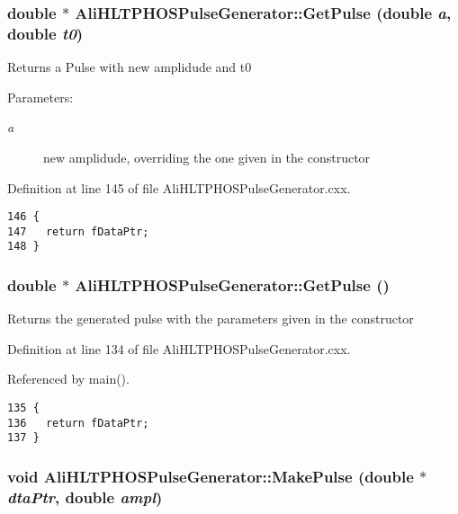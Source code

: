 \subsubsection{\setlength{\rightskip}{0pt plus 5cm}double $\ast$ Ali\-HLTPHOSPulse\-Generator::Get\-Pulse (double {\em a}, double {\em t0})}\label{classAliHLTPHOSPulseGenerator_AliHLTPHOSPulseGeneratora10}


Returns a Pulse with new amplidude and t0 \begin{Desc}
\item[Parameters:]
\begin{description}
\item[{\em a}]new amplidude, overriding the one given in the constructor \end{description}
\end{Desc}


Definition at line 145 of file Ali\-HLTPHOSPulse\-Generator.cxx.

\footnotesize\begin{verbatim}146 {
147   return fDataPtr;
148 }
\end{verbatim}\normalsize 


\subsubsection{\setlength{\rightskip}{0pt plus 5cm}double $\ast$ Ali\-HLTPHOSPulse\-Generator::Get\-Pulse ()}\label{classAliHLTPHOSPulseGenerator_AliHLTPHOSPulseGeneratora9}


Returns the generated pulse with the parameters given in the constructor 

Definition at line 134 of file Ali\-HLTPHOSPulse\-Generator.cxx.

Referenced by main().

\footnotesize\begin{verbatim}135 {
136   return fDataPtr;
137 }
\end{verbatim}\normalsize 


\subsubsection{\setlength{\rightskip}{0pt plus 5cm}void Ali\-HLTPHOSPulse\-Generator::Make\-Pulse (double $\ast$ {\em dta\-Ptr}, double {\em ampl})\hspace{0.3cm}{\tt  [private]}}\label{classAliHLTPHOSPulseGenerator_AliHLTPHOSPulseGeneratord1}


